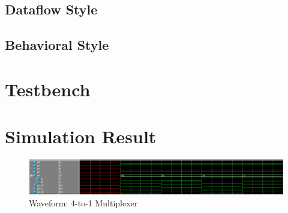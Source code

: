 \documentclass{report}
\begin{document}
                

                
            
            \subsection{Dataflow Style}

                

                

            \subsection{Behavioral Style}
                

                

        \section{Testbench} 
                

                

        \section{Simulation Result}
            \begin{figure}[!htb]
                \centering
                \includegraphics[width=\textwidth]{diagrams/waveform_mux.PNG}
                \caption{Waveform: 4-to-1 Multiplexer}
                \label{fig:waveform-mux}
            \end{figure} 
            
\end{document}
